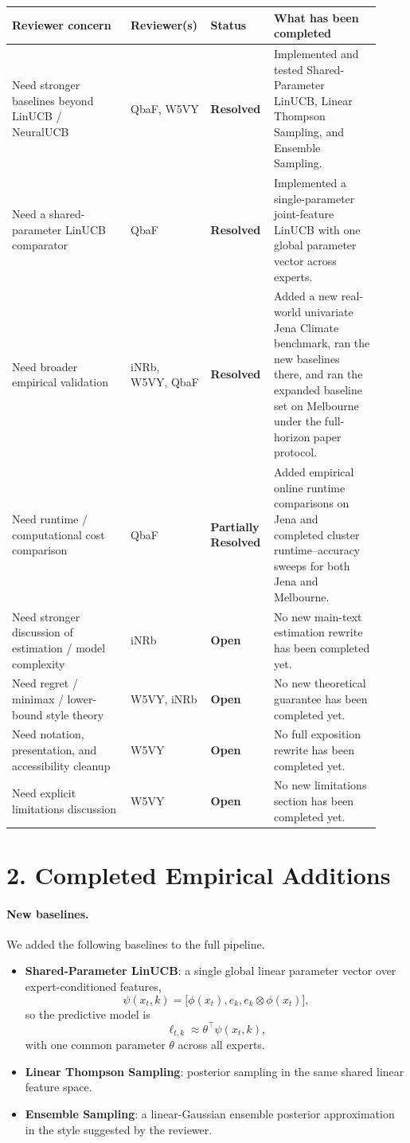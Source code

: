 \documentclass[11pt]{article}
\newcommand{\resolved}{\textbf{Resolved}}
\newcommand{\partialresolved}{\textbf{Partially Resolved}}
\newcommand{\openissue}{\textbf{Open}}
\begin{document}
\begin{longtable}{p{0.31\linewidth} p{0.16\linewidth} p{0.16\linewidth} p{0.29\linewidth}}
\toprule
\textbf{Reviewer concern} & \textbf{Reviewer(s)} & \textbf{Status} & \textbf{What has been completed} \\
\midrule
Need stronger baselines beyond LinUCB / NeuralUCB & QbaF, W5VY & \resolved & Implemented and tested Shared-Parameter LinUCB, Linear Thompson Sampling, and Ensemble Sampling. \\
Need a shared-parameter LinUCB comparator & QbaF & \resolved & Implemented a single-parameter joint-feature LinUCB with one global parameter vector across experts. \\
Need broader empirical validation & iNRb, W5VY, QbaF & \resolved & Added a new real-world univariate Jena Climate benchmark, ran the new baselines there, and ran the expanded baseline set on Melbourne under the full-horizon paper protocol. \\
Need runtime / computational cost comparison & QbaF & \partialresolved & Added empirical online runtime comparisons on Jena and completed cluster runtime--accuracy sweeps for both Jena and Melbourne. \\
Need stronger discussion of estimation / model complexity & iNRb & \openissue & No new main-text estimation rewrite has been completed yet. \\
Need regret / minimax / lower-bound style theory & W5VY, iNRb & \openissue & No new theoretical guarantee has been completed yet. \\
Need notation, presentation, and accessibility cleanup & W5VY & \openissue & No full exposition rewrite has been completed yet. \\
Need explicit limitations discussion & W5VY & \openissue & No new limitations section has been completed yet. \\
\bottomrule
\end{longtable}

\section*{2. Completed Empirical Additions}

\paragraph{New baselines.}
We added the following baselines to the full pipeline.
\begin{itemize}[leftmargin=1.5em]
    \item \textbf{Shared-Parameter LinUCB}: a single global linear parameter vector over expert-conditioned features,
    \[
    \psi(x_t,k) = \big[\phi(x_t), e_k, e_k \otimes \phi(x_t)\big],
    \]
    so the predictive model is
    \[
    \ell_{t,k} \approx \theta^\top \psi(x_t,k),
    \]
    with one common parameter $\theta$ across all experts.
    \item \textbf{Linear Thompson Sampling}: posterior sampling in the same shared linear feature space.
    \item \textbf{Ensemble Sampling}: a linear-Gaussian ensemble posterior approximation in the style suggested by the reviewer.
\end{itemize}
\end{document}
